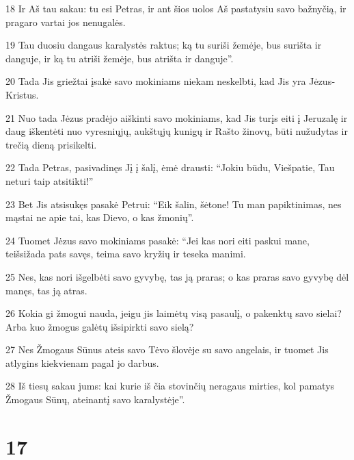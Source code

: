 \par 18 Ir Aš tau sakau: tu esi Petras, ir ant šios uolos Aš pastatysiu savo bažnyčią, ir pragaro vartai jos nenugalės. 
\par 19 Tau duosiu dangaus karalystės raktus; ką tu suriši žemėje, bus surišta ir danguje, ir ką tu atriši žemėje, bus atrišta ir danguje”. 
\par 20 Tada Jis griežtai įsakė savo mokiniams niekam neskelbti, kad Jis yra Jėzus­Kristus. 
\par 21 Nuo tada Jėzus pradėjo aiškinti savo mokiniams, kad Jis turįs eiti į Jeruzalę ir daug iškentėti nuo vyresniųjų, aukštųjų kunigų ir Rašto žinovų, būti nužudytas ir trečią dieną prisikelti. 
\par 22 Tada Petras, pasivadinęs Jį į šalį, ėmė drausti: “Jokiu būdu, Viešpatie, Tau neturi taip atsitikti!” 
\par 23 Bet Jis atsisukęs pasakė Petrui: “Eik šalin, šėtone! Tu man papiktinimas, nes mąstai ne apie tai, kas Dievo, o kas žmonių”. 
\par 24 Tuomet Jėzus savo mokiniams pasakė: “Jei kas nori eiti paskui mane, teišsižada pats savęs, teima savo kryžių ir teseka manimi. 
\par 25 Nes, kas nori išgelbėti savo gyvybę, tas ją praras; o kas praras savo gyvybę dėl manęs, tas ją atras. 
\par 26 Kokia gi žmogui nauda, jeigu jis laimėtų visą pasaulį, o pakenktų savo sielai? Arba kuo žmogus galėtų išsipirkti savo sielą? 
\par 27 Nes Žmogaus Sūnus ateis savo Tėvo šlovėje su savo angelais, ir tuomet Jis atlygins kiekvienam pagal jo darbus. 
\par 28 Iš tiesų sakau jums: kai kurie iš čia stovinčių neragaus mirties, kol pamatys Žmogaus Sūnų, ateinantį savo karalystėje”.



\chapter{17}


